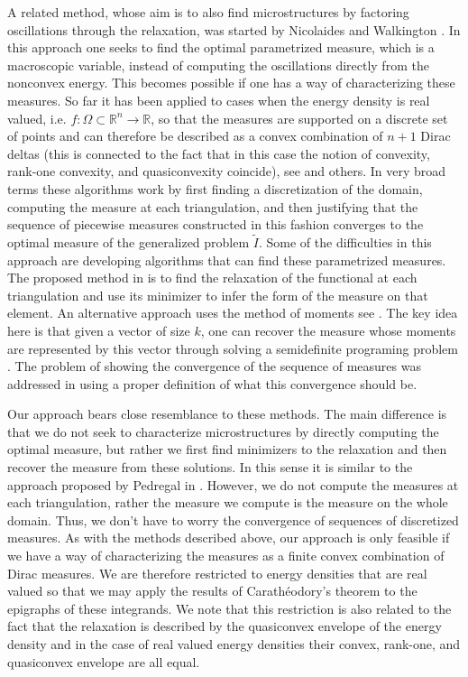 \documentclass[11pt]{article}
\newcommand{\R}{\mathbb{R}}
\theoremstyle{plain}
\begin{document}
A related method, whose aim is to also find microstructures by factoring oscillations through the relaxation, was started by Nicolaides and Walkington \cite{nicolaides1993}. In this approach one seeks to find the optimal parametrized measure, which is a macroscopic variable, instead of computing the oscillations directly from the nonconvex energy. This becomes possible if one has a way of characterizing these measures. So far it has been applied to cases when the energy density is real valued, i.e. $f: \Omega \subset \R^n \rightarrow \R$, so that the measures are supported on a discrete set of points and can therefore be described as a convex combination of $n+1$ Dirac deltas (this is connected to the fact that in this case the notion of convexity, rank-one convexity, and quasiconvexity coincide), see \cite{meziat2006, roubicek2004, pedregal1995} and others. In very broad terms these algorithms work by first finding a discretization of the domain, computing the measure at each triangulation, and then justifying that the sequence of piecewise measures constructed in this fashion converges to the optimal measure of the generalized problem $\tilde{I}$. Some of the difficulties in this approach are developing algorithms that can find these parametrized measures. The proposed method in \cite{pedregal1995, pedregal1996} is to find the relaxation of the functional at each triangulation and use its minimizer to infer the form of the measure on that element. An alternative approach uses the method of moments  see \cite{meziat2006, meziat2008, roubicek2004}. The key idea here is that given a vector of size $k$, one can recover the measure whose moments are represented by this vector through solving a semidefinite programing problem \cite{curto2000}. The problem of showing the convergence of the sequence of measures was addressed in \cite{pedregal1996} using a proper definition of what this convergence should be.

Our approach bears close resemblance to these methods. The main difference is that we do not seek to characterize microstructures by directly computing the optimal measure, but rather we first find minimizers to the relaxation and then recover the measure from these solutions. In this sense it is similar to the approach proposed by Pedregal in \cite{pedregal1995, pedregal1996}. However, we do not compute the measures at each triangulation, rather the measure we compute is the measure on the whole domain. Thus, we don't have to worry the convergence of sequences of discretized measures.  As with the methods described above, our approach is only feasible if we have a way of characterizing the measures as a finite convex combination of Dirac measures. We are therefore restricted to energy densities that are real valued so that we may apply the results of Carath\'eodory's theorem to the epigraphs of these integrands. We note that this restriction is also related to the fact that the relaxation is described by the quasiconvex envelope of the energy density and in the case of real valued energy densities their convex, rank-one, and quasiconvex envelope are all equal.
\end{document}
